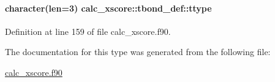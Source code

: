 \hypertarget{structcalc__xscore_1_1tbond__def_a605d49d7b0a488b81663c38e744f8464}{
\paragraph[{ttype}]{\setlength{\rightskip}{0pt plus 5cm}character(len=3) calc\-\_\-xscore\-::tbond\-\_\-def\-::ttype}}\label{structcalc__xscore_1_1tbond__def_a605d49d7b0a488b81663c38e744f8464}


Definition at line 159 of file calc\-\_\-xscore.\-f90.



The documentation for this type was generated from the following file\-:\begin{DoxyCompactItemize}
\item 
\hyperlink{calc__xscore_8f90}{calc\-\_\-xscore.\-f90}\end{DoxyCompactItemize}
